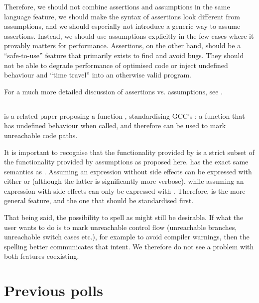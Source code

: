 Therefore, we should not combine assertions and assumptions in the same language feature, we should make the syntax of assertions look different from assumptions, and we should especially not introduce a generic way to assume assertions. Instead, we should use assumptions explicitly in the few cases where it provably matters for performance. Assertions, on the other hand, should be a ``safe-to-use'' feature that primarily exists to find and avoid bugs. They should not be able to degrade performance of optimised code or inject undefined behaviour and ``time travel'' into an otherwise valid program.

For a much more detailed discussion of assertions vs. assumptions, see \cite{P2064R0}.

\subsection{}

\cite{P0627R6} is a related paper proposing a function , standardising GCC's : a function that has undefined behaviour when called, and therefore can be used to mark unreachable code paths.

It is important to recognise that the functionality provided by  is a strict subset of the functionality provided by assumptions as proposed here.  has the exact same semantics as . Assuming an expression without side effects can be expressed with either  or  (although the latter is significantly more verbose), while assuming an expression with side effects can only be expressed with . Therefore,  is the more general feature, and the one that should be standardised first.

That being said, the possibility to spell  as  might still be desirable. If 
what the user wants to do is to mark unreachable control flow (unreachable branches, unreachable switch cases etc.), for example to avoid compiler warnings, then the spelling  better communicates that intent. We therefore do not see a problem with both features coexisting.

\section {Previous polls}
\label{sec:polls}

